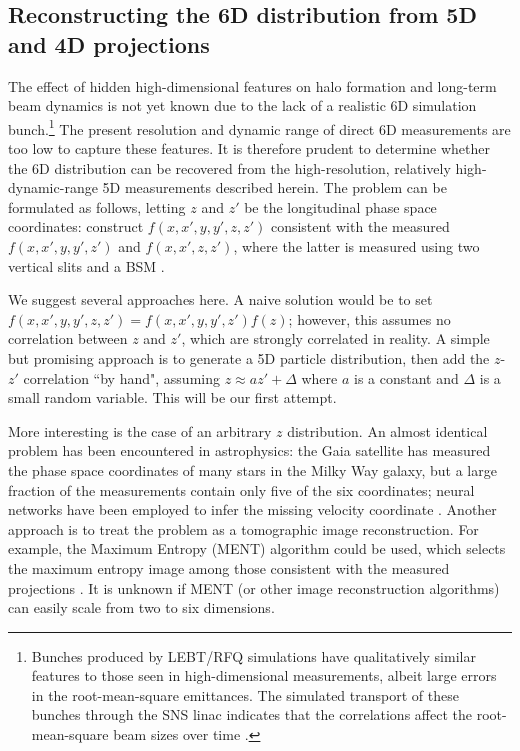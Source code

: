 \documentclass[letterpaper,
               keeplastbox,
               nospread,
               biblatex,
              ]{jacow}
\begin{document}
\subsection{Reconstructing the 6D distribution from 5D and 4D projections}

The effect of hidden high-dimensional features on halo formation and long-term beam dynamics is not yet known due to the lack of a realistic 6D simulation bunch.\footnote{
   Bunches produced by LEBT/RFQ simulations have qualitatively similar features to those seen in high-dimensional measurements, albeit large errors in the root-mean-square emittances. The simulated transport of these bunches through the SNS linac indicates that the correlations affect the root-mean-square beam sizes over time \cite{Ruisard2021-IPAC}.
} The present resolution and dynamic range of direct 6D measurements are too low to capture these features. It is therefore prudent to determine whether the 6D distribution can be recovered from the high-resolution, relatively high-dynamic-range 5D measurements described herein. The problem can be formulated as follows, letting $z$ and $z'$ be the longitudinal phase space coordinates: construct $f(x, x', y, y', z, z')$ consistent with the measured $f(x, x', y, y', z')$ and $f(x, x', z, z')$, where the latter is measured using two vertical slits and a BSM \cite{Ruisard2020}. 

We suggest several approaches here. A naive solution would be to set $f(x, x', y, y', z, z') = f(x, x', y, y', z') f(z)$; however, this assumes no correlation between $z$ and $z'$, which are strongly correlated in reality. A simple but promising approach is to generate a 5D particle distribution, then add the $z$-$z'$ correlation ``by hand", assuming $z \approx az' + \Delta$ where $a$ is a constant and $\Delta$ is a small random variable. This will be our first attempt.

More interesting is the case of an arbitrary $z$ distribution. An almost identical problem has been encountered in astrophysics: the Gaia satellite has measured the phase space coordinates of many stars in the Milky Way galaxy, but a large fraction of the measurements contain only five of the six coordinates; neural networks have been employed to infer the missing velocity coordinate \cite{Dropulic2021}. Another approach is to treat the problem as a tomographic image reconstruction. For example, the Maximum Entropy (MENT) algorithm could be used, which selects the maximum entropy image among those consistent with the measured projections \cite{Skilling1984}. It is unknown if MENT (or other image reconstruction algorithms) can easily scale from two to six dimensions.
\end{document}
